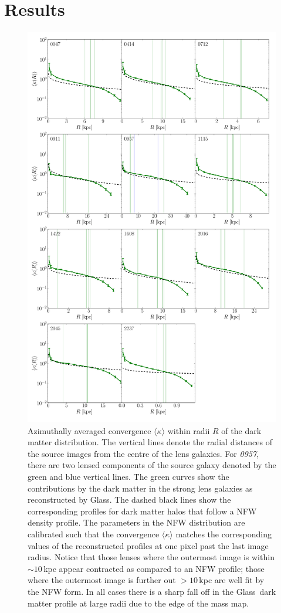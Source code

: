 \documentclass[useAMS,usenatbib]{mn2e}
\def\Glass{{\sc Glass}}
\begin{document}
\section{Results}\label{sec:results}
\begin{figure}
  \centering
  \includegraphics[width=.7\linewidth]{Figures/kappaplot.pdf}
  \caption[width=\linewidth]{Azimuthally averaged convergence $\langle\kappa\rangle$ within radii $R$ of the dark matter distribution. The vertical lines denote the radial distances of the source images from the centre of the lens galaxies. For \textit{0957}, there are two lensed components of the source galaxy denoted by the green and blue vertical lines. The green curves show the contributions by the dark matter in the strong lens galaxies as reconstructed by \Glass. The dashed black lines show the corresponding profiles for dark matter halos that follow a NFW density profile. The parameters in the NFW distribution are calibrated such that the convergence $\langle\kappa\rangle$ matches the corresponding values of the reconstructed profiles at one pixel past the last image radius. Notice that those lenses where the outermost image is within $\sim 10$\,kpc appear contracted as compared to an NFW profile; those where the outermost image is further out $> 10$\,kpc are well fit by the NFW form. In all cases there is a sharp fall off in the \Glass\ dark matter profile at large radii due to the edge of the mass map.}
  \label{fig:kappaplot}
\end{figure}
\end{document}
